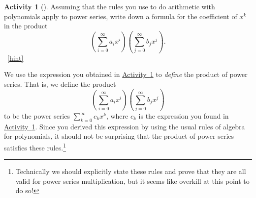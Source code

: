 \documentclass[10pt,]{book}
\theoremstyle{plain}
\theoremstyle{definition}
\theoremstyle{definition}
\theoremstyle{definition}
\newtheorem{activity}[project]{Activity}
\numberwithin{equation}{chapter}
\begin{document}
\begin{activity}[]\label{coeffinpowerseries}
\hypertarget{p-1296}{}%
Assuming that the rules you use to do arithmetic with polynomials apply to power series, write down a formula for the coefficient of \(x^k\) in the product%
\begin{equation*}
\left(\sum_{i=0}^\infty a_ix^i\right)\left(\sum_{j=0}^\infty
b_jx^j\right)\text{.}
\end{equation*}
%
~\hfill{\tiny\hyperlink{a-248}{[hint]}\hypertarget{q-248}{}}\end{activity}
\hypertarget{p-1299}{}%
We use the expression you obtained in \hyperref[coeffinpowerseries]{Activity~\ref{coeffinpowerseries}} to \emph{define} the product of power series. That is, we define the product%
\begin{equation*}
\left(\sum_{i=0}^\infty a_ix^i\right)\left(\sum_{j=0}^\infty
b_jx^j\right)
\end{equation*}
to be the power series \(\sum_{k=0}^\infty c_k x^k\), where \(c_k\) is the expression you found in \hyperref[coeffinpowerseries]{Activity~\ref{coeffinpowerseries}}. Since you derived this expression by using the usual rules of algebra for polynomials, it should not be surprising that the product of power series satisfies these rules.\footnote{Technically we should explicitly state these rules and prove that they are all valid for power series multiplication, but it seems like overkill at this point to do so!\label{fn-16}}%
\typeout{************************************************}
\typeout{************************************************}
\end{document}
